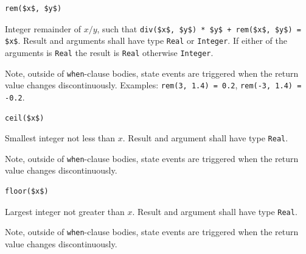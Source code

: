\begin{operatordefinition}[rem]
\begin{synopsis}\begin{lstlisting}
rem($x$, $y$)
\end{lstlisting}\end{synopsis}
\begin{semantics}
Integer remainder of $x / y$, such that \lstinline!div($x$, $y$) * $y$ + rem($x$, $y$) = $x$!.
Result and arguments shall have type \lstinline!Real! or \lstinline!Integer!.
If either of the arguments is \lstinline!Real! the result is \lstinline!Real! otherwise \lstinline!Integer!.
\begin{nonnormative}
Note, outside of \lstinline!when!-clause bodies, state events are triggered when the return value changes discontinuously.
Examples: \lstinline!rem(3, 1.4) = 0.2!, \lstinline!rem(-3, 1.4) = -0.2!.
\end{nonnormative}
\end{semantics}
\end{operatordefinition}

\begin{operatordefinition}[ceil]
\begin{synopsis}\begin{lstlisting}
ceil($x$)
\end{lstlisting}\end{synopsis}
\begin{semantics}
Smallest integer not less than $x$.
Result and argument shall have type \lstinline!Real!.
\begin{nonnormative}
Note, outside of \lstinline!when!-clause bodies, state events are triggered when the return value changes discontinuously.
\end{nonnormative}
\end{semantics}
\end{operatordefinition}

\begin{operatordefinition}[floor]
\begin{synopsis}\begin{lstlisting}
floor($x$)
\end{lstlisting}\end{synopsis}
\begin{semantics}
Largest integer not greater than $x$.
Result and argument shall have type \lstinline!Real!.
\begin{nonnormative}
Note, outside of \lstinline!when!-clause bodies, state events are triggered when the return value changes discontinuously.
\end{nonnormative}
\end{semantics}
\end{operatordefinition}

